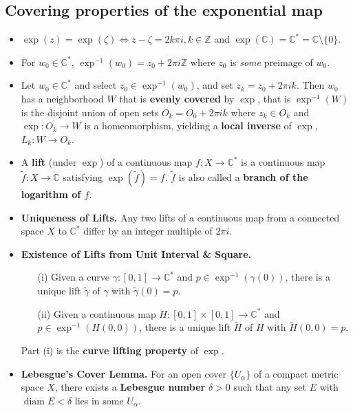 \documentclass{article}
\DeclareMathOperator{\diam}{diam}
\newenvironment{topic}[1]{%
{\subsection{#1}}%
\begin{itemize}%
}{%
\end{itemize}%
}
\newcommand{\theorem}[1]{\item {\bf #1.}}
\newcommand{\lemma}[1]{\item {\bf #1.}}
\newcommand{\term}[1]{{\bf #1}}
\newcommand{\remark}{\item}
\begin{document}
\begin{topic}{Covering properties of the exponential map}

\remark $\exp(z) = \exp(\zeta) \iff z - \zeta = 2 k \pi i, k \in \mathbb{Z}$ and $\exp(\mathbb{C}) = \mathbb{C}^\ast = \mathbb{C} \setminus \{ 0 \}$.

\remark For $w_0 \in \mathbb{C}^\ast$, $\exp^{-1}(w_0) = z_0 + 2 \pi i \mathbb{Z}$ where $z_0$ is {\em some} preimage of $w_0$.

\remark Let $w_0 \in \mathbb{C}^\ast$ and select $z_0 \in \exp^{-1}(w_0)$, and set $z_k = z_0 + 2 \pi i k$. Then $w_0$ has a neighborhood $W$ that is \term{evenly covered} by $\exp$, that is $\exp^{-1}(W)$ is the disjoint union of open sets $O_k = O_0 + 2 \pi i k$ where $z_k \in O_k$ and $\exp : O_k \to W$ is a homeomorphism, yielding a \term{local inverse} of $\exp$, $L_k : W \to O_k$.

\remark A \term{lift} (under $\exp$) of a continuous map $f : X \to \mathbb{C}^\ast$ is a continuous map $\tilde{f} : X \to \mathbb{C}$ satisfying $\exp(\tilde{f}) = f$. $\tilde{f}$ is also called a \term{branch of the logarithm of $f$}.

\begin{center}
\end{center}

\theorem{Uniqueness of Lifts} Any two lifts of a continuous map from a connected space $X$ to $\mathbb{C}^\ast$ differ by an integer multiple of $2 \pi i$.

\theorem{Existence of Lifts from Unit Interval \& Square}
\begin{enumerate}
\item[(i)] Given a curve $\gamma : [0, 1] \to \mathbb{C}^\ast$ and $p \in \exp^{-1}(\gamma(0))$, there is a unique lift $\tilde{\gamma}$ of $\gamma$ with $\tilde{\gamma}(0) = p$.
\item[(ii)] Given a continuous map $H : [0, 1] \times [0, 1] \to \mathbb{C}^\ast$ and $p \in \exp^{-1}(H(0, 0))$, there is a unique lift $\tilde{H}$ of $H$ with $\tilde{H}(0, 0) = p$.
\end{enumerate}
Part (i) is the \term{curve lifting property} of $\exp$.

\lemma{Lebesgue's Cover Lemma} For an open cover $\{U_\alpha\}$ of a compact metric space $X$, there exists a \term{Lebesgue number} $\delta > 0$ such that any set $E$ with $\diam E < \delta$ lies in some $U_\alpha$.


\end{topic}
\end{document}
